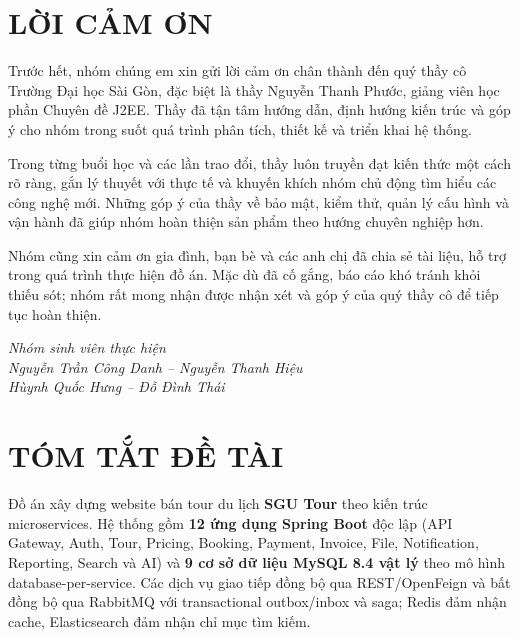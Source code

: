 
\chapter*{LỜI CẢM ƠN}

Trước hết, nhóm chúng em xin gửi lời cảm ơn chân thành đến quý thầy cô Trường Đại học Sài Gòn, đặc biệt là thầy Nguyễn Thanh Phước, giảng viên học phần Chuyên đề J2EE. Thầy đã tận tâm hướng dẫn, định hướng kiến trúc và góp ý cho nhóm trong suốt quá trình phân tích, thiết kế và triển khai hệ thống.

Trong từng buổi học và các lần trao đổi, thầy luôn truyền đạt kiến thức một cách rõ ràng, gắn lý thuyết với thực tế và khuyến khích nhóm chủ động tìm hiểu các công nghệ mới. Những góp ý của thầy về bảo mật, kiểm thử, quản lý cấu hình và vận hành đã giúp nhóm hoàn thiện sản phẩm theo hướng chuyên nghiệp hơn.

Nhóm cũng xin cảm ơn gia đình, bạn bè và các anh chị đã chia sẻ tài liệu, hỗ trợ trong quá trình thực hiện đồ án. Mặc dù đã cố gắng, báo cáo khó tránh khỏi thiếu sót; nhóm rất mong nhận được nhận xét và góp ý của quý thầy cô để tiếp tục hoàn thiện.

\vspace{8mm}
\begin{flushright}
  \textit{Nhóm sinh viên thực hiện}\\[2mm]
  \textit{Nguyễn Trần Công Danh -- Nguyễn Thanh Hiệu}\\
  \textit{Hùynh Quốc Hưng -- Đỗ Đình Thái}
\end{flushright}

\clearpage
\chapter*{TÓM TẮT ĐỀ TÀI}

Đồ án xây dựng website bán tour du lịch \textbf{SGU Tour} theo kiến trúc microservices. Hệ thống gồm \textbf{12 ứng dụng Spring Boot} độc lập (API Gateway, Auth, Tour, Pricing, Booking, Payment, Invoice, File, Notification, Reporting, Search và AI) và \textbf{9 cơ sở dữ liệu MySQL 8.4 vật lý} theo mô hình database-per-service. Các dịch vụ giao tiếp đồng bộ qua REST/OpenFeign và bất đồng bộ qua RabbitMQ với transactional outbox/inbox và saga; Redis đảm nhận cache, Elasticsearch đảm nhận chỉ mục tìm kiếm.

